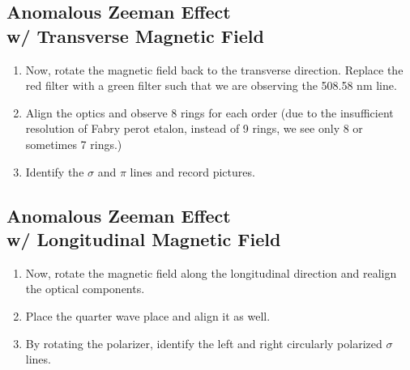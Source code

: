 \subsection{Anomalous Zeeman Effect\\w/ Transverse Magnetic Field}

\begin{enumerate}
    \item Now, rotate the magnetic field back to the transverse direction. Replace the red filter with a green filter such that we are observing the 508.58 nm line.
    \item  Align the optics and observe 8 rings for each order (due to the insufficient resolution of Fabry perot etalon, instead of 9 rings, we see only 8 or sometimes 7 rings.)
    \item Identify the $\sigma$ and $\pi$ lines and record pictures.
\end{enumerate}

\subsection{Anomalous Zeeman Effect\\w/ Longitudinal Magnetic Field}

\begin{enumerate}
    \item Now, rotate the magnetic field along the longitudinal direction and realign the optical components.
    \item Place the quarter wave place and align it as well.
    \item By rotating the polarizer, identify the left and right circularly polarized $\sigma$ lines.
\end{enumerate}